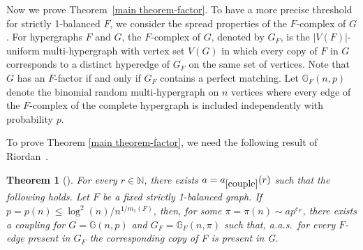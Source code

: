 \documentclass[11pt, letterpaper]{amsart}
\theoremstyle{plain}
\numberwithin{equation}{section}
\newtheorem{theorem}[thm]{Theorem}
\theoremstyle{definition}
\newcommand\card[1]{\left| #1 \right|}
\renewcommand{\vec}[1]{{\mathbf #1}}
\begin{document}

Now we prove Theorem~\ref{main theorem-factor}.
    To have a more precise threshold for strictly 1-balanced $F$, we consider the spread properties of the \(F\)-complex of \(G\). 
    For hypergraphs \(F\) and \(G\), the \(F\)-complex of \(G\), denoted by \(G_F \), is the \(\card{V(F)}\)-uniform multi-hypergraph with vertex set \(V(G)\) in which every copy of \(F\) in \(G\) corresponds to a distinct hyperedge of \(G_F\) on the same set of vertices. 
    Note that \(G\) has an \(F\)-factor if and only if \(G_F\) contains a perfect matching. 
    Let \( \mathbb{G}_F(n,p) \) denote the binomial random multi-hypergraph on \(n\) vertices where every edge of the \(F\)-complex of the complete hypergraph is included independently with probability \(p\). 

    To prove Theorem \ref{main theorem-factor}, we need the following result of Riordan~\cite[Theorem 18]{riordan2022random}.

    \begin{theorem}[\cite{riordan2022random}]\label{couple}
        For every \(r\in \mathbb{N}\), there exists \( a=a_{\ref{couple}}(r) \) such that the following holds.
        Let \(F\) be a fixed strictly 1-balanced graph. 
        If \( p = p(n) \leq \log^{2}(n)/n^{1/m_1(F)} \), then, for some \( \pi = \pi(n) \sim ap^{e_F }\), there exists a coupling for \(G=\mathbb{G}\left(n,p\right)\) and \(G_F=\mathbb{G}_{F}(n,\pi)\) such that, a.a.s.~for every \(F\)-edge present in \(G_F\) the corresponding copy of F is present in G.
    \end{theorem}
\end{document}
